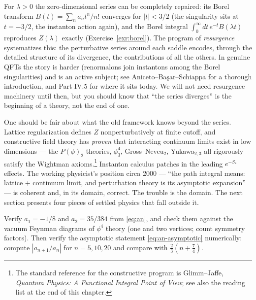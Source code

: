 \begin{reemark}
\label{rem:borel}
For $\lambda > 0$ the zero-dimensional series can be completely repaired: its
Borel transform $B(t) = \sum_n a_n t^n / n!$ converges for $|t| < 3/2$ (the
singularity sits at $t = -3/2$, the instanton action again), and the Borel
integral $\int_0^\infty dt\, e^{-t} B(\lambda t)$ reproduces $Z(\lambda)$
exactly (Exercise~\ref{exr:borel}). The program of \emph{resurgence}
systematizes this: the perturbative series around each saddle encodes, through
the detailed structure of its divergence, the contributions of all the others.
In genuine QFTs the story is harder (renormalons join instantons among the Borel
singularities) and is an active subject; see Aniceto--Ba\c{s}ar--Schiappa
 for a thorough introduction, and Part IV.5 for where it sits
today. We will not need resurgence machinery until then, but you should know
that ``the series diverges'' is the beginning of a theory, not the end of one.
\end{reemark}

One should be fair about what the old framework knows beyond the series. Lattice
regularization defines $Z$ nonperturbatively at finite cutoff, and constructive
field theory has \emph{proven} that interacting continuum limits exist in low
dimensions --- the $P(\phi)_2$ theories, $\phi^4_3$, Gross--Neveu$_2$,
Yukawa$_{2,3}$ all rigorously satisfy the Wightman axioms.\footnote{The
standard reference for the constructive program is Glimm--Jaffe,
\emph{Quantum Physics: A Functional Integral Point of View}; see also the
reading list at the end of this chapter.}
Instanton calculus patches in the leading $e^{-S_\ast}$ effects. The working
physicist's position circa 2000 --- ``the path integral means: lattice +
continuum limit, and perturbation theory is its asymptotic expansion'' --- is
coherent and, in its domain, correct. The trouble is the domain. The next
section presents four pieces of settled physics that fall outside it.

\begin{exercise}[easy]
\label{exr:an-check}
Verify $a_1 = -1/8$ and $a_2 = 35/384$ from \eqref{eq:an}, and check them
against the vacuum Feynman diagrams of $\phi^4$ theory (one and two vertices;
count symmetry factors). Then verify the asymptotic statement
\eqref{eq:an-asymptotic} numerically: compute $|a_{n+1}/a_n|$ for $n = 5, 10,
20$ and compare with $\tfrac{2}{3}(n + \tfrac{7}{4})$.
\end{exercise}

